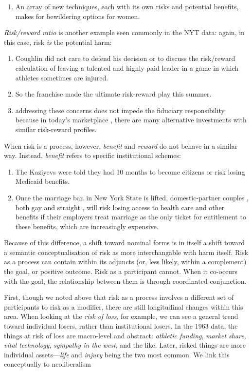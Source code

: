 \begin{enumerate} [before=\color{black}\ttfamily] \setlength\itemsep{0em} \small\item An array of new techniques, each with its own risks and potential benefits, makes for bewildering options for women.
\end{enumerate}
%
\emph{Risk/reward ratio} is another example seen commonly in the NYT data: again, in this case, risk \emph{is} the potential harm:
%
\begin{enumerate} [before=\color{black}\ttfamily] \setlength\itemsep{0em} \small\item Coughlin did not care to defend his decision or to discuss the  risk\slash reward calculation of leaving a talented and highly paid leader in a game in which athletes sometimes are injured.\item So the franchise made the ultimate risk-reward play this summer.\item addressing these concerns does not impede the fiduciary responsibility because in today's marketplace , there are many alternative investments with similar risk-reward profiles.
\end{enumerate}
%
When risk is a process, however, \emph{benefit} and \emph{reward} do not behave in a similar way. Instead, \emph{benefit} refers to specific institutional schemes:
%
\begin{enumerate} [before=\color{black}\ttfamily] \setlength\itemsep{0em} \small\item The Kaziyevs were told they had 10 months to become citizens or risk losing Medicaid benefits.\item Once the marriage ban in New York State is lifted, domestic-partner couples , both gay and straight , will risk losing access to health care and other benefits if their employers treat marriage as the only ticket for entitlement to these benefits, which are increasingly expensive.
\end{enumerate}
%
Because of this difference, a shift toward nominal forms is in itself a shift toward a semantic conceptualisation of risk as more interchangable with harm itself. Risk as a process can contain within its adjuncts (or, less likely, within a complement) the goal, or positive outcome. Risk as a participant cannot. When it co-occurs with the goal, the relationship between them is through coordinated conjunction.

First, though we noted above that risk as a process involves a different set of participants to risk as a modifier, there are still longitudinal changes within this area. When looking at the \emph{risk of loss}, for example, we can see a general trend toward individual losers, rather than institutional losers. In the 1963 data, the things at risk of loss are macro-level and abstract: \emph{athletic funding}, \emph{market share}, \emph{vital technology}, \emph{sympathy in the west}, and the like. Later, risked things are more individual assets---\emph{life} and \emph{injury} being the two most common. We link this conceptually to neoliberalism

